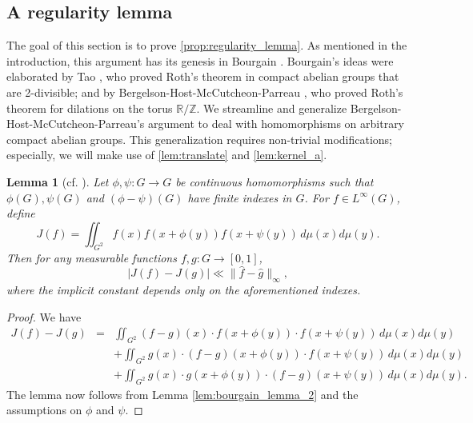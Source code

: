 \documentclass[10pt]{article}
\newtheorem{lemma}[lemma]{Lemma}
\theoremstyle{definition}
\newcommand{\R}{\mathbb{R}}
\newcommand{\Z}{\mathbb{Z}}
\begin{document}
\subsection{A regularity lemma}
The goal of this section is to prove \cref{prop:regularity_lemma}. As mentioned in the introduction, this argument has its genesis in Bourgain \cite{bourgain-roth}. Bourgain's ideas were elaborated by Tao \cite{tao}, who proved Roth's theorem in compact abelian groups that are 2-divisible; and by Bergelson-Host-McCutcheon-Parreau \cite[Theorem 4.1]{bhmp}, who proved Roth's theorem for dilations on the torus $\R / \Z$. We streamline and generalize Bergelson-Host-McCutcheon-Parreau's argument to deal with homomorphisms on arbitrary compact abelian groups. This generalization requires non-trivial modifications; especially, we will make use of \cref{lem:translate} and \cref{lem:kernel_a}. 



\begin{lemma}[cf. {\cite[Lemma 4.2]{bhmp}}]
\label{lem:J}
Let $\phi, \psi: G \rightarrow G$ be continuous homomorphisms such that $\phi(G), \psi(G)$ and $(\phi-\psi)(G)$ have finite indexes in $G$. For $f \in L^\infty(G)$, define
\[
J(f) = \iint_{G^2} f(x)f(x+ \phi(y))f(x+ \psi(y)) \, d\mu(x) d\mu(y).
\]
Then for any measurable functions $f, g: G \to [0,1]$, 
    \begin{equation*} \label{eq:c}
        |J(f) - J(g)| \ll \| \widehat{f} - \widehat{g} \|_\infty,
    \end{equation*}
where the implicit constant depends only on the aforementioned indexes. 
\end{lemma}

\begin{proof}
We have
\begin{eqnarray*}
J(f) - J(g) &=& \iint_{G^2} (f-g)(x) \cdot f(x+ \phi(y)) \cdot f(x+ \psi(y)) \, d\mu(x) d\mu(y) \\
& & + \iint_{G^2} g(x) \cdot ( f-g) (x+ \phi(y)) \cdot f(x+ \psi(y)) \, d\mu(x) d\mu(y) \\
& & + \iint_{G^2} g(x) \cdot g(x+ \phi(y)) \cdot (f - g) (x + \psi(y)) \, d\mu(x) d\mu(y).
\end{eqnarray*}
The lemma now follows from Lemma \ref{lem:bourgain_lemma_2} and the assumptions on $\phi$ and $\psi$.
\end{proof}
\end{document}
